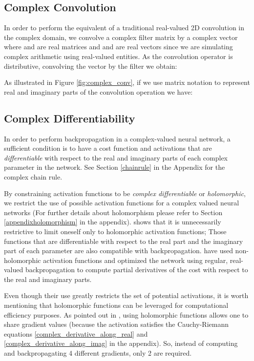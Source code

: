 \documentclass{article}
\begin{document}
\subsection{Complex Convolution}
In order to perform the equivalent of a traditional real-valued 2D convolution in the complex domain, we convolve a complex filter matrix  by a complex vector  where  and  are real matrices and  and  are real vectors since we are simulating complex arithmetic using real-valued entities. As the convolution operator is distributive, convolving the vector  by the filter  we obtain:

As illustrated in Figure \ref{fig:complex_conv}, if we use matrix notation to represent real and imaginary parts of the convolution operation we have:


\subsection{Complex Differentiability}
In order to perform backpropagation in a complex-valued neural network, a sufficient condition is to have a cost function and activations that are \textit{differentiable} with respect to the real and imaginary parts of each complex parameter in the network. See Section \ref{chainrule} in the Appendix for the complex chain rule.

By constraining activation functions to be \textit{complex differentiable} or \textit{holomorphic}, we restrict the use of possible activation functions for a complex valued neural networks (For further details about holomorphism please refer to Section \ref{appendixholomorphism} in the appendix). \cite{hirose2012generalization} shows that it is unnecessarily restrictive to limit oneself only to holomorphic activation functions; Those functions that are differentiable with respect to the real part and the imaginary part of each parameter are also compatible with backpropagation. \citep{arjovsky2015unitary,wisdom2016full,danihelka2016associative} have used non-holomorphic activation functions and optimized the network using regular, real-valued backpropagation to compute partial derivatives of the cost with respect to the real and imaginary parts.

Even though their use greatly restricts the set of potential activations, it is worth mentioning that holomorphic functions can be leveraged for computational efficiency purposes. As pointed out in \cite{sarroff2015learning}, using holomorphic functions allows one to share gradient values (because the activation satisfies the Cauchy-Riemann equations \ref{complex_derivative_along_real} and \ref{complex_derivative_along_imag} in the appendix). So, instead of computing and backpropagating 4 different gradients, only 2 are required.
\end{document}
